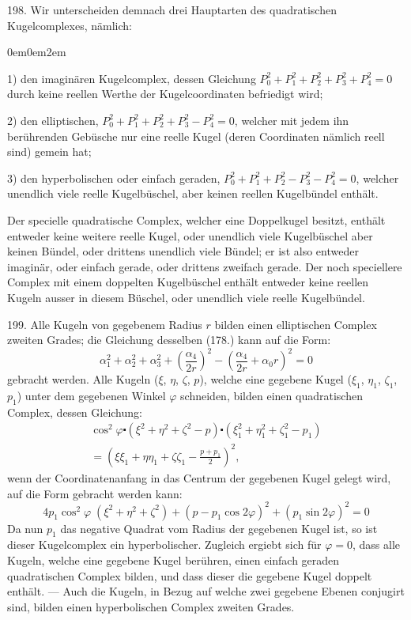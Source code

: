 198. Wir unterscheiden demnach drei Hauptarten des
quadratischen Kugelcomplexes, n\"amlich:
\begin{list}{}{\itemsep0em\parsep0em\leftmargin2em}
\item[1)] den imagin\"aren Kugelcomplex, dessen Gleichung $P_0^2 +
P_1^2 + P_2^2 + P_3^2 + P_4^2 = 0$ durch keine reellen Werthe
der Kugelcoordinaten befriedigt wird;
\item[2)] den elliptischen, $P_0^2 + P_1^2 + P_2^2 + P_3^2 - P_4^2 = 0$, welcher
mit jedem ihn ber\"uhrenden Geb\"usche nur eine reelle Kugel
(deren Coordinaten n\"amlich reell sind) gemein hat;
\item[3)] den hyperbolischen oder einfach geraden, $P_0^2 + P_1^2
+ P_2^2 - P_3^2 - P_4^2 = 0$, welcher unendlich viele reelle
Kugelb\"uschel, aber keinen reellen Kugelb\"undel enth\"alt.
\end{list}
Der specielle quadratische Complex, welcher eine Doppelkugel
besitzt, ent\-h\"alt entweder keine weitere reelle Kugel,
oder unendlich viele Kugelb\"uschel aber keinen B\"undel, oder
drittens unendlich viele B\"undel; er ist also entweder imagin\"ar,
oder einfach gerade, oder drittens zweifach gerade. Der noch
speciellere Complex mit einem doppelten Kugelb\"uschel enth\"alt
entweder keine reellen Kugeln ausser in diesem B\"uschel,
oder unendlich viele reelle Kugelb\"undel.

199. Alle Kugeln von gegebenem Radius $r$ bilden einen
elliptischen Complex zweiten Grades; die Gleichung desselben
(178.) kann auf die Form:
\[
\alpha_1^2 + \alpha_2^2 + \alpha_3^2 +
\left( \frac{\alpha_4}{2r} \right)^2 -
\left( \frac{\alpha_4}{2r} + \alpha_0 r \right)^2
= 0
\]
gebracht werden. Alle Kugeln ($\xi$, $\eta$, $\zeta$, $p$), welche eine gegebene
Kugel ($\xi_1$, $\eta_1$, $\zeta_1$, $p_1$) unter dem gegebenen Winkel $\varphi$ schneiden,
bilden einen quadratischen Complex, dessen Gleichung:
\begin{gather*}
  \cos^2 \varphi \centerdot
  (\xi^2 + \eta^2 + \zeta^2 - p) \centerdot
  (\xi_1^2 + \eta_1^2 + \zeta_1^2 - p_1)
\\
= \left(
\xi\xi_1 + \eta\eta_1 + \zeta\zeta_1 - \frac{p+p_1}{2}
\right)^2 ,
\end{gather*}
wenn der Coordinatenanfang in das Centrum der gegebenen
Kugel gelegt wird, auf die Form gebracht werden kann:
\[
4 p_1 \cos^2\varphi \;(\xi^2+\eta^2+\zeta^2)
+ (p - p_1 \cos 2\varphi)^2 + (p_1 \sin 2\varphi)^2
= 0
\]
Da nun $p_1$ das negative Quadrat vom Radius der gegebenen
Kugel ist, so ist dieser Kugelcomplex ein hyperbolischer.
Zugleich ergiebt sich f\"ur $\varphi = 0$, dass alle Kugeln, welche
eine gegebene Kugel ber\"uhren, einen einfach geraden quadratischen
Complex bilden, und dass dieser die gegebene Kugel
doppelt enth\"alt. --- Auch die Kugeln, in Bezug auf welche
zwei gegebene Ebenen conjugirt sind, bilden einen hyperbolischen
Complex zweiten Grades.

